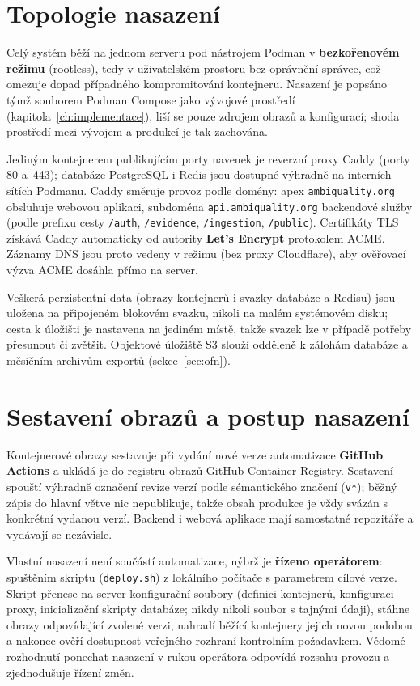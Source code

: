\section{Topologie nasazení}
\label{sec:nasazeni-topologie}

Celý systém běží na jednom serveru pod nástrojem Podman v \textbf{bezkořenovém režimu} (rootless), tedy v uživatelském prostoru bez oprávnění správce, což omezuje dopad případného kompromitování kontejneru. Nasazení je popsáno týmž souborem Podman Compose jako vývojové prostředí (kapitola~\ref{ch:implementace}), liší se pouze zdrojem obrazů a konfigurací; shoda prostředí mezi vývojem a produkcí je tak zachována.

Jediným kontejnerem publikujícím porty navenek je reverzní proxy Caddy (porty 80 a~443); databáze PostgreSQL i Redis jsou dostupné výhradně na interních sítích Podmanu. Caddy směruje provoz podle domény: apex \texttt{ambiquality.org} obsluhuje webovou aplikaci, subdoména \texttt{api.ambiquality.org} backendové služby (podle prefixu cesty \texttt{/auth}, \texttt{/evidence}, \texttt{/ingestion}, \texttt{/public}). Certifikáty TLS získává Caddy automaticky od autority \textbf{Let's Encrypt} \parencite{letsEncrypt} protokolem ACME. Záznamy DNS jsou proto vedeny v režimu  (bez proxy Cloudflare), aby ověřovací výzva ACME dosáhla přímo na server.

Veškerá perzistentní data (obrazy kontejnerů i svazky databáze a Redisu) jsou uložena na připojeném blokovém svazku, nikoli na malém systémovém disku; cesta k úložišti je nastavena na jediném místě, takže svazek lze v případě potřeby přesunout či zvětšit. Objektové úložiště S3 slouží odděleně k zálohám databáze a měsíčním archivům exportů (sekce~\ref{sec:ofn}).

\section{Sestavení obrazů a postup nasazení}
\label{sec:nasazeni-postup}

Kontejnerové obrazy sestavuje při vydání nové verze automatizace \textbf{GitHub Actions} \parencite{githubActions} a ukládá je do registru obrazů GitHub Container Registry. Sestavení spouští výhradně označení revize verzí podle sémantického značení (\texttt{v*}); běžný zápis do hlavní větve nic nepublikuje, takže obsah produkce je vždy svázán s konkrétní vydanou verzí. Backend i webová aplikace mají samostatné repozitáře a vydávají se nezávisle.

Vlastní nasazení není součástí automatizace, nýbrž je \textbf{řízeno operátorem}: spuštěním skriptu (\texttt{deploy.sh}) z lokálního počítače s parametrem cílové verze. Skript přenese na server konfigurační soubory (definici kontejnerů, konfiguraci proxy, inicializační skripty databáze; nikdy nikoli soubor s tajnými údaji), stáhne obrazy odpovídající zvolené verzi, nahradí běžící kontejnery jejich novou podobou a nakonec ověří dostupnost veřejného rozhraní kontrolním požadavkem. Vědomé rozhodnutí ponechat nasazení v rukou operátora odpovídá rozsahu provozu a zjednodušuje řízení změn.

